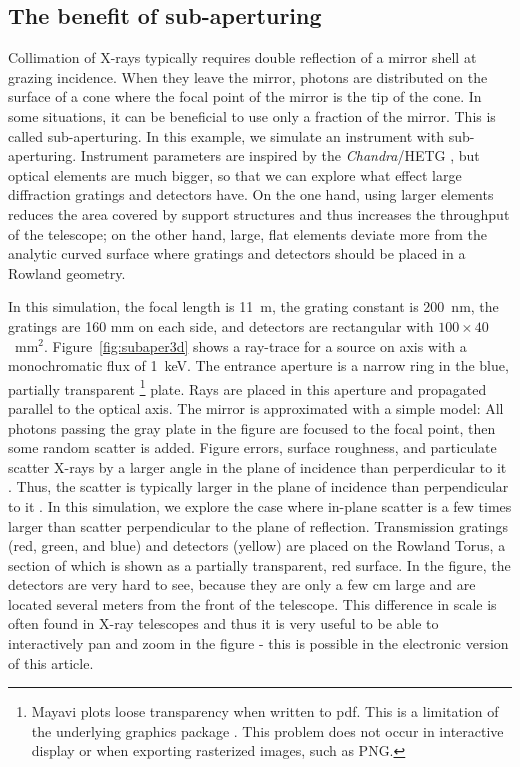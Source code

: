 \documentclass[twocolumn]{aastex61}
\begin{document}
\subsection{The benefit of sub-aperturing}
Collimation of X-rays typically requires double reflection of a mirror
shell at grazing incidence. When they leave the mirror, photons are distributed
on the surface of a cone where the focal point of the mirror is the tip of the
cone. In some situations, it can be beneficial to use only a fraction of the mirror. This is called sub-aperturing. In this
example, we simulate an instrument with sub-aperturing. Instrument parameters
are inspired by the \emph{Chandra}/HETG \citep{2005PASP..117.1144C}, but
optical elements are much bigger, so that we can explore what effect large
diffraction gratings and detectors have. On the one hand, using larger elements
reduces the area covered by support structures and thus increases the
throughput of the telescope; on the other hand, large, flat elements deviate
more from the analytic curved surface where gratings and detectors should be
placed in a Rowland geometry.

In this simulation, the focal length is 11~m, the grating constant is 200~nm,
the gratings are 160 mm on each side, and detectors are rectangular with
$100\times40$~mm$^2$. Figure~\ref{fig:subaper3d} shows a ray-trace for a source
on axis with a monochromatic flux of 1~keV. The entrance aperture is a narrow
ring in the blue, partially transparent
\footnote{Mayavi plots loose transparency when written to pdf. This is a
  limitation of the underlying graphics package \citep[see discussion
    in][]{2016ApJ...818..115V}. This problem does not occur in interactive
  display or when exporting rasterized images, such as PNG.}
plate. Rays are
placed in this aperture and propagated parallel to the optical axis. The mirror
is approximated with a simple model: All photons passing the gray plate in the figure are
focused to the focal point, then some random scatter is added. Figure errors,
surface roughness, and particulate scatter X-rays by a larger angle in the
plane of incidence than perperdicular to it \citep{Cash:87}. Thus, the scatter
is typically larger in the plane of incidence than perpendicular to it
\citep{doi:10.1117/12.140551,doi:10.1117/12.2188988}. In this simulation, we
explore the case where in-plane scatter is a few times larger than scatter
perpendicular to the plane of reflection.  Transmission gratings (red, green,
and blue) and detectors (yellow) are placed on the Rowland Torus, a section of
which is shown as a partially transparent, red surface. In the figure, the
detectors are very hard to see, because they are only a few cm large and are
located several meters from the front of the telescope. This difference in
scale is often found in X-ray telescopes and thus it is very useful to be able
to interactively pan and zoom in the figure - this is possible in the
electronic version of this article.
\end{document}

